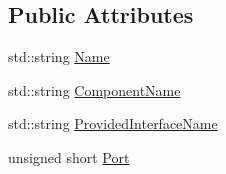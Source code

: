 \subsection*{Public Attributes}
\begin{DoxyCompactItemize}
\item 
std\-::string \hyperlink{classmts_socket_proxy_server_constructor_arg_a05eb610590735162e1be4eafc818dce4}{Name}
\item 
std\-::string \hyperlink{classmts_socket_proxy_server_constructor_arg_a7cd929776ffbbf302ec5fcc98868cab3}{Component\-Name}
\item 
std\-::string \hyperlink{classmts_socket_proxy_server_constructor_arg_a4139b875611ccc0e0e3ab736de92262a}{Provided\-Interface\-Name}
\item 
unsigned short \hyperlink{classmts_socket_proxy_server_constructor_arg_ac07f9d939ccab28f9e3a81376b24d1c1}{Port}
\end{DoxyCompactItemize}


